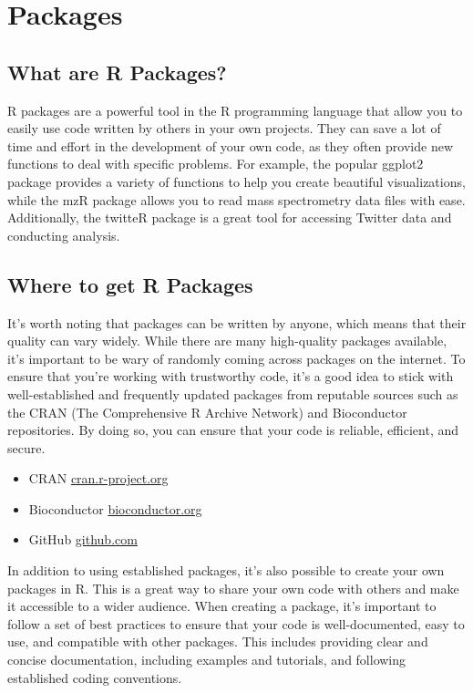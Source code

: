 \documentclass[
]{book}
\providecommand{\tightlist}{%
  \setlength{\itemsep}{0pt}\setlength{\parskip}{0pt}}
\begin{document}
\hypertarget{packages}{%
\section{Packages}\label{packages}}

\hypertarget{what-are-r-packages}{%
\subsection{What are R Packages?}\label{what-are-r-packages}}

R packages are a powerful tool in the R programming language that allow you to easily use code written by others in your own projects. They can save a lot of time and effort in the development of your own code, as they often provide new functions to deal with specific problems. For example, the popular ggplot2 package provides a variety of functions to help you create beautiful visualizations, while the mzR package allows you to read mass spectrometry data files with ease. Additionally, the twitteR package is a great tool for accessing Twitter data and conducting analysis.

\hypertarget{where-to-get-r-packages}{%
\subsection{Where to get R Packages}\label{where-to-get-r-packages}}

It's worth noting that packages can be written by anyone, which means that their quality can vary widely. While there are many high-quality packages available, it's important to be wary of randomly coming across packages on the internet. To ensure that you're working with trustworthy code, it's a good idea to stick with well-established and frequently updated packages from reputable sources such as the CRAN (The Comprehensive R Archive Network) and Bioconductor repositories. By doing so, you can ensure that your code is reliable, efficient, and secure.

\begin{itemize}
\tightlist
\item
  CRAN \href{https://cran.r-project.org/}{cran.r-project.org}
\item
  Bioconductor \href{https://bioconductor.org/}{bioconductor.org}
\item
  GitHub \href{https://github.com/}{github.com}
\end{itemize}

In addition to using established packages, it's also possible to create your own packages in R. This is a great way to share your own code with others and make it accessible to a wider audience. When creating a package, it's important to follow a set of best practices to ensure that your code is well-documented, easy to use, and compatible with other packages. This includes providing clear and concise documentation, including examples and tutorials, and following established coding conventions.
\end{document}
